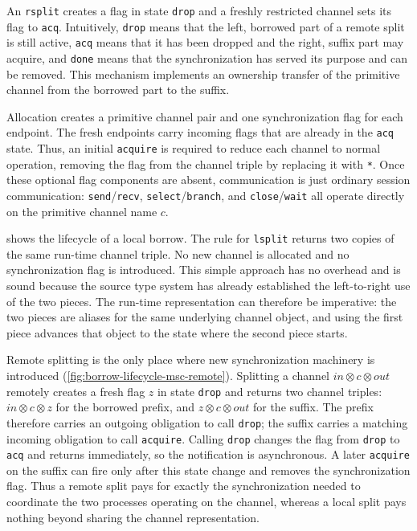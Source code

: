 An \lstinline{rsplit} creates a flag in state
\lstinline{drop} and a freshly restricted channel sets its flag to \lstinline{acq}.
Intuitively, \lstinline{drop} means that the left, borrowed
part of a remote split is still active, \lstinline{acq} means that it
has been dropped and the right, suffix part may acquire, and \lstinline{done}
means that the synchronization has served its purpose and can be
removed. This mechanism implements an ownership transfer of the
primitive channel from the borrowed part to the suffix.

Allocation creates a primitive channel pair and one synchronization
flag for each endpoint. The fresh endpoints carry incoming flags that
are already in the \lstinline{acq} state. Thus, an initial
\lstinline{acquire} is required to reduce each channel to normal
operation, removing the flag from the 
channel triple by replacing it with \lstinline{*}. Once these optional
flag components are absent, communication is just ordinary
session communication: \lstinline{send}/\lstinline{recv},
\lstinline{select}/\lstinline{branch}, and \lstinline{close}/\lstinline{wait}
all operate directly on the primitive channel name $c$.

 shows the lifecycle of a local borrow. The rule for
\lstinline{lsplit} returns two copies of the same run-time channel
triple. No new channel is allocated and no synchronization flag
is introduced. This simple approach has no overhead and is sound
because the source type system has already established the left-to-right use of the two pieces. The
run-time representation can therefore be imperative: the two pieces are
aliases for the same underlying channel object, and using the first
piece advances that object to the state where the second piece starts.

Remote splitting is the only place where new synchronization
machinery is introduced
(\cref{fig:borrow-lifecycle-msc-remote}). Splitting a channel
$in \otimes c \otimes out$ remotely creates a fresh flag $z$ in state
\lstinline{drop} and returns two channel triples:
$in \otimes c \otimes z$ for the borrowed prefix, and
$z \otimes c \otimes out$ for the suffix. The prefix therefore carries
an outgoing obligation to call \lstinline{drop}; the suffix carries a
matching incoming obligation to call \lstinline{acquire}. Calling
\lstinline{drop} changes the flag from \lstinline{drop} to
\lstinline{acq} and returns immediately, so the notification is
asynchronous. A later \lstinline{acquire} on the suffix can fire only
after this state change and removes the synchronization
flag. Thus a remote split pays for exactly the
synchronization needed to coordinate the two processes operating on
the channel, whereas a local
split pays nothing beyond sharing the channel representation.

